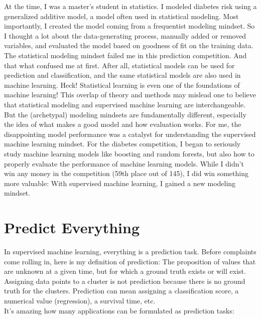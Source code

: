 \documentclass[
  10pt,
]{scrbook}
\begin{document}
At the time, I was a master's student in statistics.
I modeled diabetes risk using a generalized additive model, a model often used in statistical modeling.
Most importantly, I created the model coming from a frequentist modeling mindset.
So I thought a lot about the data-generating process, manually added or removed variables, and evaluated the model based on goodness of fit on the training data.
The statistical modeling mindset failed me in this prediction competition.
And that what confused me at first.
After all, statistical models can be used for prediction and classification, and the same statistical models are also used in machine learning.
Heck! Statistical learning is even one of the foundations of machine learning!
This overlap of theory and methods may mislead one to believe that statistical modeling and supervised machine learning are interchangeable.
But the (archetypal) modeling mindsets are fundamentally different, especially the idea of what makes a good model and how evaluation works.
For me, the disappointing model performance was a catalyst for understanding the supervised machine learning mindset.
For the diabetes competition, I began to seriously study machine learning models like boosting and random forests, but also how to properly evaluate the performance of machine learning models.
While I didn't win any money in the competition (59th place out of 145), I did win something more valuable:
With supervised machine learning, I gained a new modeling mindset.

\hypertarget{predict-everything}{%
\section{Predict Everything}\label{predict-everything}}

In supervised machine learning, everything is a prediction task.
Before complaints come rolling in, here is my definition of prediction:
The proposition of values that are unknown at a given time, but for which a ground truth exists or will exist.
Assigning data points to a cluster is not prediction because there is no ground truth for the clusters.
Prediction can mean assigning a classification score, a numerical value (regression), a survival time, etc.\\
It's amazing how many applications can be formulated as prediction tasks:
\end{document}
